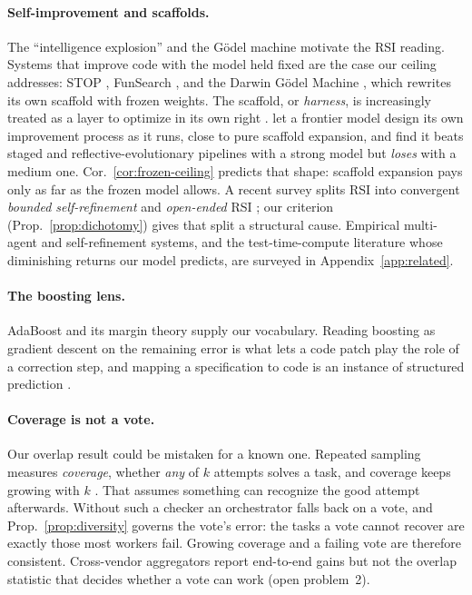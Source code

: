 \documentclass{article}
\theoremstyle{remark}
\theoremstyle{plain}
\begin{document}
\paragraph{Self-improvement and scaffolds.} The ``intelligence explosion'' \citep{good1965speculations, bostrom2014superintelligence} and the G\"odel machine \citep{schmidhuber2003goedel} motivate the RSI reading. Systems that improve code with the model held fixed are the case our ceiling addresses: STOP \citep{zelikman2023stop}, FunSearch \citep{romeraparedes2024funsearch}, and the Darwin G\"odel Machine \citep{zhang2025darwin}, which rewrites its own scaffold with frozen weights. The scaffold, or \emph{harness}, is increasingly treated as a layer to optimize in its own right \citep{he2026harness}. \citet{xue2026rethinking} let a frontier model design its own improvement process as it runs, close to pure scaffold expansion, and find it beats staged and reflective-evolutionary pipelines \citep{agrawal2025gepa} with a strong model but \emph{loses} with a medium one. Cor.~\ref{cor:frozen-ceiling} predicts that shape: scaffold expansion pays only as far as the frozen model allows. A recent survey splits RSI into convergent \emph{bounded self-refinement} and \emph{open-ended} RSI \citep{chen2026recursive}; our criterion (Prop.~\ref{prop:dichotomy}) gives that split a structural cause. Empirical multi-agent and self-refinement systems, and the test-time-compute literature whose diminishing returns our model predicts, are surveyed in Appendix~\ref{app:related}.

\paragraph{The boosting lens.} AdaBoost \citep{freund1997decision} and its margin theory \citep{schapire1998boosting, schapire2013explaining} supply our vocabulary. Reading boosting as gradient descent on the remaining error \citep{mason2000boosting, friedman2001greedy} is what lets a code patch play the role of a correction step, and mapping a specification to code is an instance of structured prediction \citep{tsochantaridis2005large}.

\paragraph{Coverage is not a vote.} Our overlap result could be mistaken for a known one. Repeated sampling measures \emph{coverage}, whether \emph{any} of $k$ attempts solves a task, and coverage keeps growing with $k$ \citep{brown2024monkeys}. That assumes something can recognize the good attempt afterwards. Without such a checker an orchestrator falls back on a vote, and Prop.~\ref{prop:diversity} governs the vote's error: the tasks a vote cannot recover are exactly those most workers fail. Growing coverage and a failing vote are therefore consistent. Cross-vendor aggregators \citep{wang2024mixtureofagents, jiang2023llmblender} report end-to-end gains but not the overlap statistic that decides whether a vote can work (open problem~2).
\end{document}
